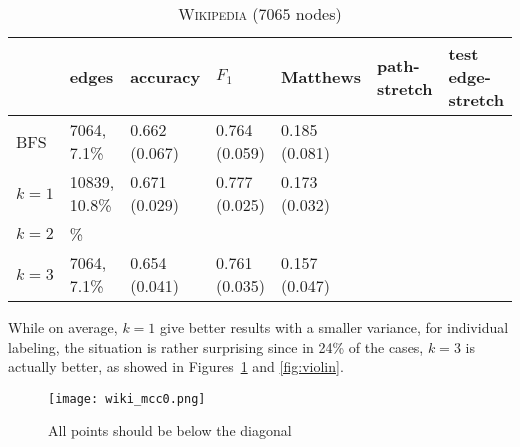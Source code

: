 \documentclass[a4paper,final,notitlepage,11pt,svgnames]{scrartcl}
\begin{document}
\begin{table}[htpb]
	\centering
	\caption{\textsc{Wikipedia} ($7065$ nodes) \label{tab:wiki}}
	\begin{tabular}{lllllll}
		\toprule
		& edges       & accuracy      & $F_1$         & Matthews      & path-stretch & test edge-stretch \\
		\midrule
		BFS      & 7064, 7.1\% & 0.662 (0.067) & 0.764 (0.059) & 0.185 (0.081) &              & \\
		$k=1$    & 10839, 10.8\%          & 0.671 (0.029) & 0.777 (0.025) & 0.173 (0.032) &              & \\
		$k=2$    & \%          &               &               &               &              & \\
		$k=3$    & 7064, 7.1\%          & 0.654 (0.041) & 0.761 (0.035) & 0.157 (0.047) &              & \\
		\bottomrule
	\end{tabular}
\end{table}

While on average, $k=1$ give better results with a smaller variance, for
individual labeling, the situation is rather surprising since in 24\% of the
cases, $k=3$ is actually better, as showed in Figures~\ref{fig:mcc0} and
\ref{fig:violin}.

\begin{figure}[htpb]
	\centering
	\texttt{[image: wiki\_mcc0.png]}
	\caption{All points should be below the diagonal \label{fig:mcc0}}
\end{figure}
\end{document}
